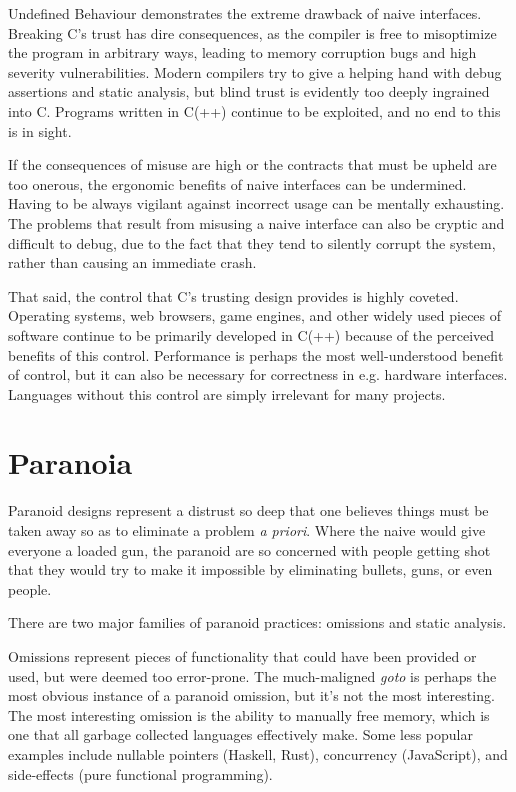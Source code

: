 Undefined Behaviour demonstrates the extreme drawback of naive interfaces.
Breaking C's trust has dire consequences, as the compiler is free to misoptimize
the program in arbitrary ways, leading to memory corruption bugs and high
severity vulnerabilities. Modern compilers try to give a helping hand with debug
assertions and static analysis, but blind trust is evidently too deeply
ingrained into C. Programs written in C(++) continue to be exploited,
and no end to this is in sight.

If the consequences of misuse are high or the contracts that must be upheld are
too onerous, the ergonomic benefits of naive interfaces can be undermined.
Having to be always vigilant against incorrect usage can be mentally exhausting.
The problems that result from misusing a naive interface can also be cryptic and
difficult to debug, due to the fact that they tend to silently corrupt the system,
rather than causing an immediate crash.

That said, the control that C's trusting design provides is highly coveted.
Operating systems, web browsers, game engines, and other widely used pieces of
software continue to be primarily developed in C(++) because of the perceived
benefits of this control. Performance is perhaps the most well-understood benefit
of control, but it can also be necessary for correctness in e.g. hardware
interfaces. Languages without this control are simply irrelevant for many projects.





\section{Paranoia}

Paranoid designs represent a distrust so deep that one believes things must be
taken away so as to eliminate a problem \emph{a priori}. Where the naive would give
everyone a loaded gun, the paranoid are so concerned with people getting shot
that they would try to make it impossible by eliminating bullets, guns, or even
people.

There are two major families of paranoid practices: omissions and static analysis.

Omissions represent pieces of functionality that could have been provided or
used, but were deemed too error-prone. The much-maligned \emph{goto} is perhaps
the most obvious instance of a paranoid omission, but it's not the most
interesting. The most interesting omission is the ability to manually free memory,
which is one that all garbage collected languages effectively make.
Some less popular examples include nullable pointers (Haskell, Rust),
concurrency (JavaScript), and side-effects (pure functional programming).

